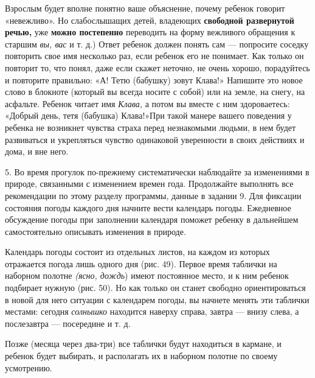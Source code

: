 \documentclass[a5paper]{book}
\renewcommand{\emph}[1]{\textit{#1}}
\begin{document}
Взрослым будет вполне понятно ваше объяснение, почему ребенок говорит
«невежливо». Но слабослышащих детей, владеющих \textbf{свободной
развернутой речью,} уже \textbf{можно постепенно} переводить на форму
вежливого обращения к старшим \emph{вы, вас} и т. д.) Ответ ребенок
должен понять сам --- попросите соседку повторить свое имя несколько
раз, если ребенок его не понимает. Как только он повторит то, что понял,
даже если скажет неточно, не очень хорошо, порадуйтесь и повторите
правильно: «А! Тетю (бабушку) зовут Клава!» Напишите это новое слово в
блокноте (который вы всегда носите с собой) или на земле, на снегу, на
асфальте. Ребенок читает имя \emph{Клава,} а потом вы вместе с ним
здороваетесь: «Добрый день, тетя (бабушка) Клава!»При такой манере
вашего поведения у ребенка не возникнет чувства страха перед незнакомыми
людьми, в нем будет развиваться и укрепляться чувство одинаковой
уверенности в своих действиях и дома, и вне него.

5. Во время прогулок по-прежнему систематически наблюдайте за
изменениями в природе, связанными с изменением времен года. Продолжайте
выполнять все рекомендации по этому разделу программы, данные в задании
9. Для фиксации состояния погоды каждого дня начните вести календарь
погоды. Ежедневное обсуждение погоды при заполнении календаря поможет
ребенку в дальнейшем самостоятельно описывать изменения в природе.

Календарь погоды состоит из отдельных листов, на каждом из которых
отражается погода лишь одного дня (рис. 49). Первое время таблички на
наборном полотне \emph{(ясно, дождь}) имеют постоянное место, и к ним
ребенок подбирает нужную (рис. 50). Но как только он станет свободно
ориентироваться в новой для него ситуации с календарем погоды, вы
начнете менять эти таблички местами: сегодня \emph{солнышко} находится
наверху справа, завтра --- внизу слева, а послезавтра --- посередине и
т. д.

Позже (месяца через два-три) все таблички будут находиться в кармане, и
ребенок будет выбирать, и располагать их в наборном полотне по своему
усмотрению.
\end{document}
